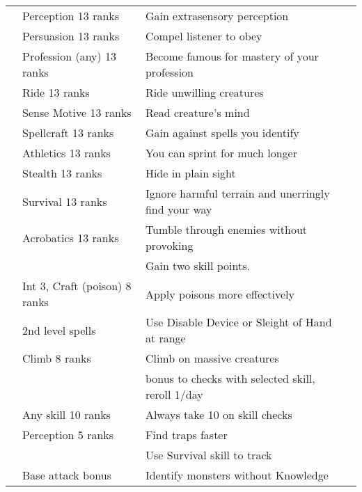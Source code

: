 {\begin{longtabu}{>{\lcol}p{10em} >{\lcol}p{15em} >{\lcol}X >{\lcol}p{3em}}
     & Perception 13 ranks & Gain extrasensory perception &  \\
     & Persuasion 13 ranks & Compel listener to obey &  \\
     & Profession (any) 13 ranks & Become famous for mastery of your profession &  \\
     & Ride 13 ranks & Ride unwilling creatures &  \\
     & Sense Motive 13 ranks & Read creature's mind &  \\
     & Spellcraft 13 ranks & Gain  against spells you identify &  \\
     & Athletics 13 ranks & You can sprint for much longer &  \\
     & Stealth 13 ranks & Hide in plain sight &  \\
     & Survival 13 ranks & Ignore harmful terrain and unerringly find your way &  \\
     & Acrobatics 13 ranks & Tumble through enemies without provoking &  \\
     & \x & Gain two skill points. &  \\
     & Int 3, Craft (poison) 8 ranks & Apply poisons more effectively &  \\
     &  2nd level spells & Use Disable Device or Sleight of Hand at range &  \\
     & Climb 8 ranks & Climb on massive creatures &  \\
     & \x &   bonus to checks with selected skill, reroll 1/day &  \\
     & Any skill 10 ranks & Always take 10 on skill checks &  \\
     & Perception 5 ranks & Find traps faster &  \\
     & \x &  Use Survival skill to track &  \\
     & Base attack bonus  & Identify monsters without Knowledge &  \\


\end{longtabu}}
